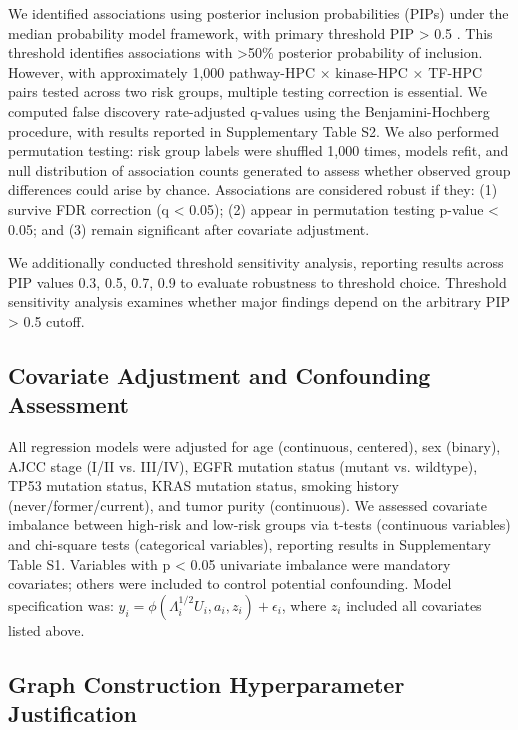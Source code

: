 \documentclass[pdflatex,article,12pt]{article}
\begin{document}
We identified associations using posterior inclusion probabilities (PIPs) under the median probability model framework, with primary threshold PIP > 0.5 \cite{barbieri2004optimal}. This threshold identifies associations with >50\% posterior probability of inclusion. However, with approximately 1,000 pathway-HPC × kinase-HPC × TF-HPC pairs tested across two risk groups, multiple testing correction is essential. We computed false discovery rate-adjusted q-values using the Benjamini-Hochberg procedure, with results reported in Supplementary Table S2. We also performed permutation testing: risk group labels were shuffled 1,000 times, models refit, and null distribution of association counts generated to assess whether observed group differences could arise by chance. Associations are considered robust if they: (1) survive FDR correction (q < 0.05); (2) appear in permutation testing p-value < 0.05; and (3) remain significant after covariate adjustment.

We additionally conducted threshold sensitivity analysis, reporting results across PIP values {0.3, 0.5, 0.7, 0.9} to evaluate robustness to threshold choice. Threshold sensitivity analysis examines whether major findings depend on the arbitrary PIP > 0.5 cutoff.

\subsection{Covariate Adjustment and Confounding Assessment}

All regression models were adjusted for age (continuous, centered), sex (binary), AJCC stage (I/II vs. III/IV), EGFR mutation status (mutant vs. wildtype), TP53 mutation status, KRAS mutation status, smoking history (never/former/current), and tumor purity (continuous). We assessed covariate imbalance between high-risk and low-risk groups via t-tests (continuous variables) and chi-square tests (categorical variables), reporting results in Supplementary Table S1. Variables with p < 0.05 univariate imbalance were mandatory covariates; others were included to control potential confounding. Model specification was: $y_i = \phi(\Lambda_i^{1/2} U_i, a_i, z_i) + \epsilon_i$, where $z_i$ included all covariates listed above.

\subsection{Graph Construction Hyperparameter Justification}
\end{document}

